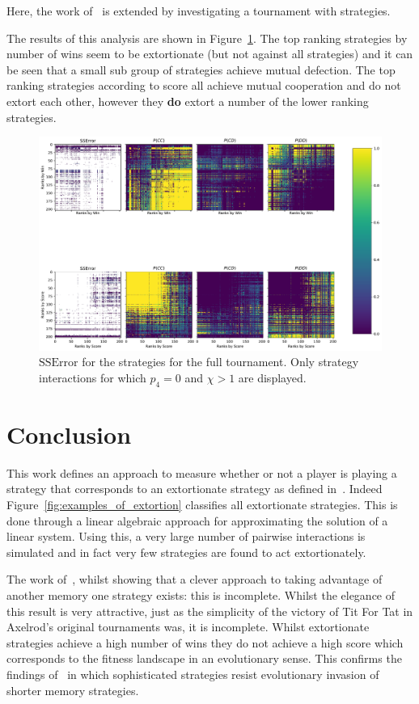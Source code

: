 \documentclass[a4paper]{article}
\begin{document}
Here, the work of~\cite{Stewart2012} is extended by investigating a tournament
with 
strategies.

The results of this analysis are shown in
Figure~\ref{fig:SSError_and_probabilities_in_full}. The top ranking strategies
by number of wins seem to be extortionate (but not against all strategies) and
it can be seen that a small sub group of strategies achieve mutual defection.
The top ranking strategies according to score all achieve mutual cooperation and
do not extort each other, however they
\textbf{do} extort a number of the lower ranking strategies.

\begin{figure}[!htbp]
    \centering
    \includegraphics[width=.8\textwidth]{./assets/img/SSError_and_probabilities_in_full/main.pdf}
    \caption{\(\text{SSError}\) for the strategies for the full tournament. Only
    strategy interactions for which \(p_4=0\) and \(\chi>1\) are displayed.}
    \label{fig:SSError_and_probabilities_in_full}
\end{figure}


\section{Conclusion}\label{sec:conclusion}

This work defines an approach to measure whether or not a player is playing a
strategy that corresponds to an extortionate strategy as defined
in~\cite{Press2012}. Indeed Figure~\ref{fig:examples_of_extortion} classifies
all extortionate strategies. This is done through a linear algebraic approach
for approximating the solution of a linear system. Using this, a very large
number of pairwise interactions is simulated and in fact very few strategies are
found to act extortionately.

The work of~\cite{Press2012}, whilst showing that a clever approach to taking
advantage of another memory one strategy exists: this is incomplete. Whilst the
elegance of this result is very attractive, just as the simplicity of the
victory of Tit For Tat in Axelrod's original tournaments was, it is incomplete.
Whilst extortionate strategies achieve a high number of wins they do not
achieve a high score which corresponds to the fitness landscape in an
evolutionary sense. This confirms
the findings of~\cite{Moran1707} in which sophisticated strategies resist
evolutionary invasion of shorter memory strategies.
\end{document}
